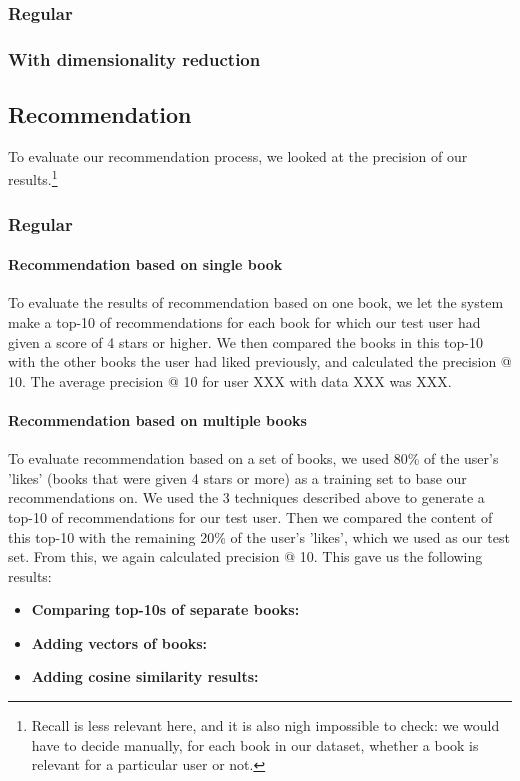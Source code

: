 \documentclass[10pt,a4paper]{paper}
\begin{document}
\subsubsection{Regular}


\subsubsection{With dimensionality reduction}


\subsection{Recommendation}

To evaluate our recommendation process, we looked at the precision of our results.\footnote{Recall is less relevant here, and it is also nigh impossible to check: we would have to decide manually, for each book in our dataset, whether a book is relevant for a particular user or not.}


\subsubsection{Regular}

\paragraph{Recommendation based on single book}
To evaluate the results of recommendation based on one book, we let the system make a top-10 of recommendations for each book for which our test user had given a score of 4 stars or higher. We then compared the books in this top-10 with the other books the user had liked previously, and calculated the precision @ 10.
The average precision @ 10 for user XXX with data XXX was XXX. %

\paragraph{Recommendation based on multiple books}
To evaluate recommendation based on a set of books, we used 80\% of the user's 'likes' (books that were given 4 stars or more) as a training set to base our recommendations on. We used the 3 techniques described above to generate a top-10 of recommendations for our test user. Then we compared the content of this top-10 with the remaining 20\% of the user's 'likes', which we used as our test set.
From this, we again calculated precision @ 10.
This gave us the following results:
\begin{itemize}
\item \textbf{Comparing top-10s of separate books:} %
\item \textbf{Adding vectors of books:}
\item \textbf{Adding cosine similarity results:}
\end{itemize}
\end{document}
